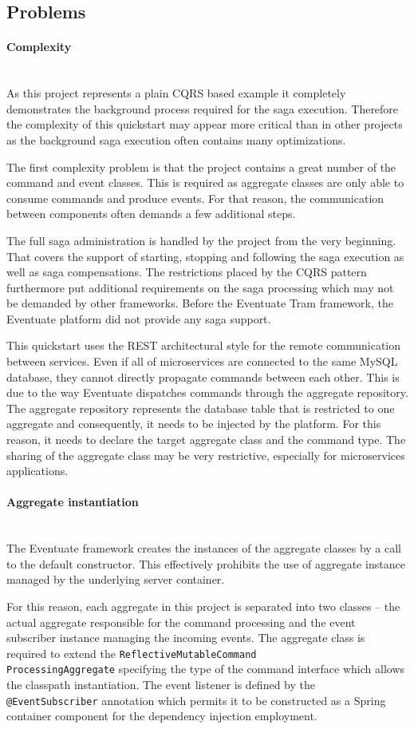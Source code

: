 \documentclass[oneside,
  digital, %
  table,   %
  nolof,     %
  nolot,     %
]{fithesis3}
\newcommand{\newlinepar}[1]{\paragraph{#1}\needspace{4\baselineskip}\mbox{}\\}
\begin{document}
\subsection{Problems}

\newlinepar{Complexity}

As this project represents a plain CQRS based example it completely demonstrates the background process required for the saga execution. Therefore the complexity of this quickstart may appear more critical than in other projects as the background saga execution often contains many optimizations.

The first complexity problem is that the project contains a great number of the command and event classes. This is required as aggregate classes are only able to consume commands and produce events. For that reason,  the communication between components often demands a few additional steps.

The full saga administration is handled by the project from the very beginning. That covers the support of starting, stopping and following the saga execution as well as saga compensations. The restrictions placed by the CQRS pattern furthermore put additional requirements on the saga processing which may not be demanded by other frameworks. Before the Eventuate Tram framework, the Eventuate platform did not provide any saga support.

This quickstart uses the REST architectural style for the remote communication between services. Even if all of microservices are connected to the same MySQL database, they cannot directly propagate commands between each other. This is due to the way Eventuate dispatches commands through the aggregate repository. The aggregate repository represents the database table that is restricted to one aggregate and consequently, it needs to be injected by the platform. For this reason, it needs to declare the target aggregate class and the command type. The sharing of the aggregate class may be very restrictive, especially for microservices applications.

\newlinepar{Aggregate instantiation}

The Eventuate framework creates the instances of the aggregate classes by a call to the default constructor. This effectively prohibits the use of aggregate instance managed by the underlying server container. 

For this reason, each aggregate in this project is separated into two classes -- the actual aggregate responsible for the command processing and the event subscriber instance managing the incoming events. The  aggregate class is required to extend the \texttt{ReflectiveMutableCommand\\ProcessingAggregate} specifying the type of the command interface which allows the classpath instantiation. The event listener is defined by the \texttt{@EventSubscriber} annotation which permits it to be constructed as a Spring container component for the dependency injection employment. 
\end{document}
